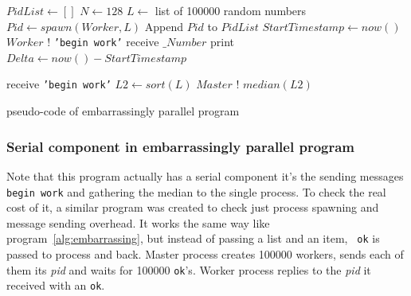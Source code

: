 \documentclass[english,11pt]{l4proj}
\begin{document}
\begin{algorithm}
    \begin{algorithmic}
            \State $PidList \gets []$
            \State $N \gets 128$
                \State $L \gets$ list of 100000 random numbers
            \EndFor
            \State $Pid \gets spawn(Worker, L)$
            \State Append $Pid$ to $PidList$
            \State $StartTimestamp \gets now()$
                \State $Worker$ ! {\tt 'begin work'}
            \EndFor
                \State receive $\_Number$
            \EndFor
            \State print $Delta \gets now() - StartTimestamp$
        \EndFunction

            \State receive {\tt 'begin work'}
            \State $L2 \gets sort(L)$
            \State $Master$ ! $median(L2)$
        \EndFunction
    \end{algorithmic}
    \caption{pseudo-code of embarrassingly parallel program}
    \label{alg:embarrassing}
\end{algorithm}

\subsubsection{Serial component in embarrassingly parallel program}

Note that this program actually has a serial component it's the sending messages
{\tt begin work} and gathering the median to the single process. To check the
real cost of it, a similar program was created to check just process spawning
and message sending overhead. It works the same way like
program~\ref{alg:embarrassing}, but instead of passing a list and an item, {\tt
ok} is passed to process and back. Master process creates 100000 workers, sends
each of them its {\em pid} and waits for 100000 {\tt ok}'s. Worker process
replies to the {\em pid} it received with an {\tt ok}.
\end{document}
